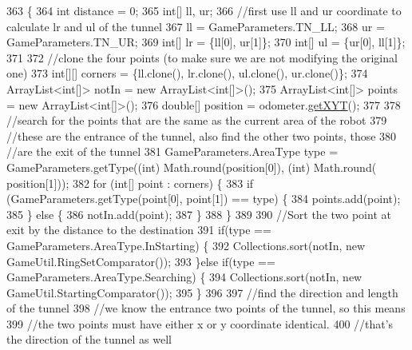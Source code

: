 \begin{DoxyCode}
363                                                  \{
364     \textcolor{keywordtype}{int} distance = 0;
365     \textcolor{keywordtype}{int}[] ll, ur;
366     \textcolor{comment}{//first use ll and ur coordinate to calculate lr and ul of the tunnel}
367     ll = GameParameters.TN\_LL;
368     ur = GameParameters.TN\_UR;
369     \textcolor{keywordtype}{int}[] lr = \{ll[0], ur[1]\};
370     \textcolor{keywordtype}{int}[] ul = \{ur[0], ll[1]\};
371     
372     \textcolor{comment}{//clone the four points (to make sure we are not modifying the original one)}
373     \textcolor{keywordtype}{int}[][] corners = \{ll.clone(), lr.clone(), ul.clone(), ur.clone()\};
374     ArrayList<int[]> notIn = \textcolor{keyword}{new} ArrayList<int[]>();
375     ArrayList<int[]> points = \textcolor{keyword}{new} ArrayList<int[]>();
376     \textcolor{keywordtype}{double}[] position = odometer.\hyperlink{classca_1_1mcgill_1_1ecse211_1_1odometer_1_1_odometer_data_a8f40f0264c68f0cbed4fff1723ae7863}{getXYT}();
377     
378     \textcolor{comment}{//search for the points that are the same as the current area of the robot}
379     \textcolor{comment}{//these are the entrance of the tunnel, also find the other two points, those}
380     \textcolor{comment}{//are the exit of the tunnel}
381     GameParameters.AreaType type = GameParameters.getType((\textcolor{keywordtype}{int}) Math.round(position[0]), (int) Math.round(
      position[1]));
382     \textcolor{keywordflow}{for} (\textcolor{keywordtype}{int}[] point : corners) \{
383       \textcolor{keywordflow}{if} (GameParameters.getType(point[0], point[1]) == type) \{
384         points.add(point);
385       \} \textcolor{keywordflow}{else} \{
386         notIn.add(point);
387       \}
388     \}
389     
390     \textcolor{comment}{//Sort the two point at exit by the distance to the destination}
391     \textcolor{keywordflow}{if}(type == GameParameters.AreaType.InStarting) \{
392       Collections.sort(notIn, \textcolor{keyword}{new} GameUtil.RingSetComparator());
393     \}\textcolor{keywordflow}{else} \textcolor{keywordflow}{if}(type == GameParameters.AreaType.Searching) \{
394       Collections.sort(notIn, \textcolor{keyword}{new} GameUtil.StartingComparator());
395     \}
396     
397     \textcolor{comment}{//find the direction and length of the tunnel}
398     \textcolor{comment}{//we know the entrance two points of the tunnel, so this means }
399     \textcolor{comment}{//the two points must have either x or y coordinate identical.}
400     \textcolor{comment}{//that's the direction of the tunnel as well}

\end{DoxyCode}
